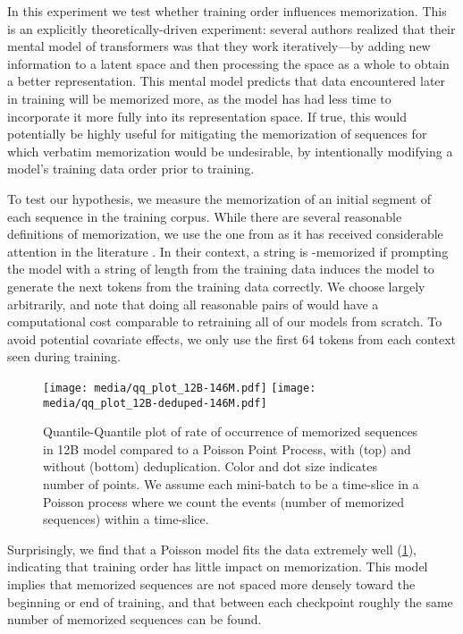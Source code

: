 \documentclass{article}
\theoremstyle{plain}
\theoremstyle{definition}
\theoremstyle{remark}
\begin{document}
In this experiment we test whether training order influences memorization. This is an explicitly theoretically-driven experiment: several authors realized that their mental model of transformers was that they work iteratively---by adding new information to a latent space and then processing the space as a whole to obtain a better representation. This mental model predicts that data encountered later in training will be memorized more, as the model has had less time to incorporate it more fully into its representation space. If true, this would potentially be highly useful for mitigating the memorization of sequences for which verbatim memorization would be undesirable, by intentionally modifying a model's training data order prior to training. 



To test our hypothesis, we measure the memorization of an initial segment of each sequence in the training corpus. While there are several reasonable definitions of memorization, we use the one from \citet{carlini2021extracting} as it has received considerable attention in the literature \citep{yoon2021model,huang2022large,ginart2022submix,ippolito2022preventing,biderman2023emergent}. In their context, a string is -memorized if prompting the model with a string of length  from the training data induces the model to generate the next  tokens from the training data correctly. We choose  largely arbitrarily, and note that doing all reasonable pairs of  would have a computational cost comparable to retraining all of our models from scratch. To avoid potential covariate effects, we only use the first 64 tokens from each context seen during training.

\begin{figure}[!htb]
    \centering
    \texttt{[image: media/qq\_plot\_12B-146M.pdf]}
    \texttt{[image: media/qq\_plot\_12B-deduped-146M.pdf]}
    \caption{Quantile-Quantile plot of rate of occurrence of memorized sequences in 12B model compared to a Poisson Point Process, with (top) and without (bottom) deduplication. Color and dot size indicates number of points. We assume each mini-batch to be a time-slice in a Poisson process where we count the events (number of memorized sequences) within a time-slice.}
    \label{fig:qq_plots}
\end{figure}

Surprisingly, we find that a Poisson model fits the data extremely well (\cref{fig:qq_plots}), indicating that training order has little impact on memorization. This model implies that memorized sequences are not spaced more densely toward the beginning or end of training, and that between each checkpoint roughly the same number of memorized sequences can be found.
\end{document}
